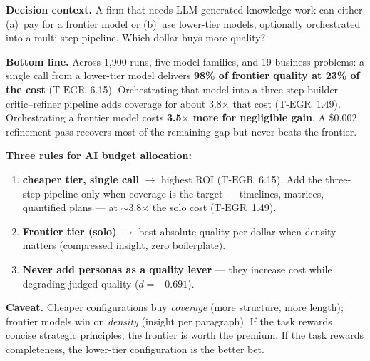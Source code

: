 \documentclass[12pt,a4paper]{article}
\newcommand{\TEGR}{\ensuremath{\text{T-EGR}}}
\begin{document}
\begin{mdframed}[style=execsummary]
\noindent\textbf{Decision context.} A firm that needs LLM-generated knowledge
work can either (a)~pay for a frontier model or (b)~use lower-tier models,
optionally orchestrated into a multi-step pipeline. Which dollar buys more
quality?

\medskip
\noindent\textbf{Bottom line.} Across 1{,}900 runs, five model families, and 19
business problems: a single call from a lower-tier model delivers
\textbf{98\% of frontier quality at 23\% of the cost} ($\TEGR$~6.15).
Orchestrating that model into a three-step builder--critic--refiner pipeline
adds coverage for about 3.8$\times$ that cost ($\TEGR$~1.49). Orchestrating a
frontier model costs \textbf{3.5$\times$ more for negligible gain}. A \$0.002
refinement pass recovers most of the remaining gap but never beats the
frontier.

\medskip
\noindent\textbf{Three rules for AI budget allocation:}
\begin{enumerate}[leftmargin=*,nosep]
  \item \textbf{cheaper tier, single call} $\to$ highest ROI
    ($\TEGR$~6.15). Add the three-step pipeline only when coverage is the
    target --- timelines, matrices, quantified plans --- at $\sim$3.8$\times$
    the solo cost ($\TEGR$~1.49).
  \item \textbf{Frontier tier (solo)} $\to$ best absolute quality per dollar
    when density matters (compressed insight, zero boilerplate).
  \item \textbf{Never add personas as a quality lever} --- they increase cost
    while degrading judged quality ($d = -0.691$).
\end{enumerate}

\medskip
\noindent\textbf{Caveat.} Cheaper configurations buy \emph{coverage} (more
structure, more length); frontier models win on \emph{density} (insight per
paragraph). If the task rewards concise strategic principles, the frontier is
worth the premium. If the task rewards completeness, the lower-tier
configuration is the better bet.
\end{mdframed}
\end{document}
